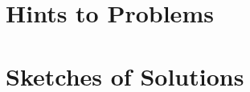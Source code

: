 \chapter{Hints to Problems}\label{app:hints}
\begin{enumerate}
	
\end{enumerate}

\chapter{Sketches of Solutions}\label{app:sol}
\begin{enumerate}
	
\end{enumerate}
